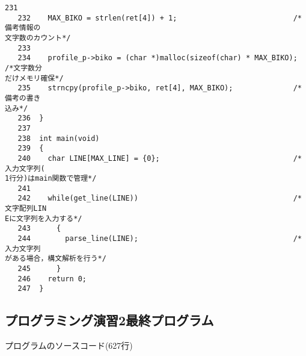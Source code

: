 \begin{Verbatim}[fontsize=\small, baselinestretch=0.8]
   231	
   232	  MAX_BIKO = strlen(ret[4]) + 1;                           /*備考情報の
文字数のカウント*/
   233	
   234	  profile_p->biko = (char *)malloc(sizeof(char) * MAX_BIKO); /*文字数分
だけメモリ確保*/
   235	  strncpy(profile_p->biko, ret[4], MAX_BIKO);              /*備考の書き
込み*/
   236	}
   237	
   238	int main(void)
   239	{
   240	  char LINE[MAX_LINE] = {0};                               /*入力文字列(
1行分)はmain関数で管理*/
   241	
   242	  while(get_line(LINE))                                    /*文字配列LIN
Eに文字列を入力する*/
   243	    {
   244	      parse_line(LINE);                                    /*入力文字列
がある場合，構文解析を行う*/
   245	    }
   246	  return 0;
   247	}
\end{Verbatim}

\subsection{プログラミング演習2最終プログラム}\label{funclast}
プログラムのソースコード(627行)
